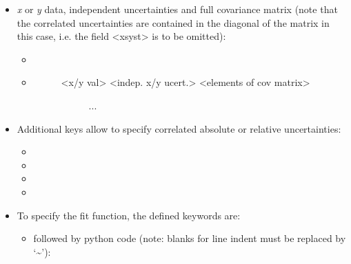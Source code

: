 \documentclass[a4paper,10pt,english]{sphinxmanual}
\begin{document}
\begin{fulllineitems}
\begin{itemize}
\begin{itemize}
\begin{description}
\begin{description}
\end{description}

\end{description}

\end{itemize}

\item {} 
\emph{x} or \emph{y} data, independent uncertainties and full covariance matrix (note
that the correlated uncertainties are contained in the diagonal of the
matrix in this case, i.e. the field \textless{}xsyst\textgreater{} is to be omitted):
\begin{itemize}
\item {} 

\item {} \begin{description}
\item[{}] \leavevmode\begin{description}
\item[{\textless{}x/y val\textgreater{}  \textless{}indep. x/y ucert.\textgreater{}  \textless{}elements of cov matrix\textgreater{}}] \leavevmode
...

\end{description}

\end{description}

\end{itemize}

\item {} 
Additional keys allow to specify correlated absolute or relative
uncertainties:
\begin{itemize}
\item {} 

\item {} 

\item {} 

\item {} 

\end{itemize}

\item {} 
To specify the fit function, the defined keywords are:
\begin{itemize}
\item {} 
  followed by python code (note: blanks for line
indent must be replaced by `\textasciitilde{}'):


\end{itemize}
\end{itemize}
\end{fulllineitems}
\end{document}
